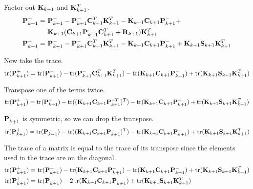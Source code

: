 Factor out $\mathbf{K}_{k+1}$ and $\mathbf{K}_{k+1}^T$.
\begin{align}
  \mathbf{P}_{k+1}^+ =~&
    \mathbf{P}_{k+1}^- - \mathbf{P}_{k+1}^-\mathbf{C}_{k+1}^T\mathbf{K}_{k+1}^T -
    \mathbf{K}_{k+1}\mathbf{C}_{k+1}\mathbf{P}_{k+1}^- + \nonumber \\
    &\mathbf{K}_{k+1}(\mathbf{C}_{k+1}\mathbf{P}_{k+1}^-\mathbf{C}_{k+1}^T +
    \mathbf{R}_{k+1})\mathbf{K}_{k+1}^T \nonumber \\
  \mathbf{P}_{k+1}^+ =~&
    \mathbf{P}_{k+1}^- - \mathbf{P}_{k+1}^-\mathbf{C}_{k+1}^T\mathbf{K}_{k+1}^T -
    \mathbf{K}_{k+1}\mathbf{C}_{k+1}\mathbf{P}_{k+1}^- +
    \mathbf{K}_{k+1}\mathbf{S}_{k+1}\mathbf{K}_{k+1}^T \label{eq:post_p_update}
\end{align}

Now take the trace.
\begin{equation*}
  \operatorname{tr}(\mathbf{P}_{k+1}^+) =
    \operatorname{tr}(\mathbf{P}_{k+1}^-) - \operatorname{tr}(\mathbf{P}_{k+1}^-\mathbf{C}_{k+1}^T\mathbf{K}_{k+1}^T) -
    \operatorname{tr}(\mathbf{K}_{k+1}\mathbf{C}_{k+1}\mathbf{P}_{k+1}^-) +
    \operatorname{tr}(\mathbf{K}_{k+1}\mathbf{S}_{k+1}\mathbf{K}_{k+1}^T)
\end{equation*}

Transpose one of the terms twice.
\begin{equation*}
  \operatorname{tr}(\mathbf{P}_{k+1}^+) = \operatorname{tr}(\mathbf{P}_{k+1}^-) -
    \operatorname{tr}((\mathbf{K}_{k+1}\mathbf{C}_{k+1}\mathbf{P}_{k+1}^{-T})^T) -
    \operatorname{tr}(\mathbf{K}_{k+1}\mathbf{C}_{k+1}\mathbf{P}_{k+1}^-) +
    \operatorname{tr}(\mathbf{K}_{k+1}\mathbf{S}_{k+1}\mathbf{K}_{k+1}^T)
\end{equation*}

$\mathbf{P}_{k+1}^-$ is symmetric, so we can drop the transpose.
\begin{equation*}
  \operatorname{tr}(\mathbf{P}_{k+1}^+) = \operatorname{tr}(\mathbf{P}_{k+1}^-) -
    \operatorname{tr}((\mathbf{K}_{k+1}\mathbf{C}_{k+1}\mathbf{P}_{k+1}^-)^T) -
    \operatorname{tr}(\mathbf{K}_{k+1}\mathbf{C}_{k+1}\mathbf{P}_{k+1}^-) +
    \operatorname{tr}(\mathbf{K}_{k+1}\mathbf{S}_{k+1}\mathbf{K}_{k+1}^T)
\end{equation*}

The trace of a matrix is equal to the trace of its transpose since the elements
used in the trace are on the diagonal.
\begin{align*}
  \operatorname{tr}(\mathbf{P}_{k+1}^+) &= \operatorname{tr}(\mathbf{P}_{k+1}^-) -
    \operatorname{tr}(\mathbf{K}_{k+1}\mathbf{C}_{k+1}\mathbf{P}_{k+1}^-) -
    \operatorname{tr}(\mathbf{K}_{k+1}\mathbf{C}_{k+1}\mathbf{P}_{k+1}^-) +
    \operatorname{tr}(\mathbf{K}_{k+1}\mathbf{S}_{k+1}\mathbf{K}_{k+1}^T) \\
  \operatorname{tr}(\mathbf{P}_{k+1}^+) &= \operatorname{tr}(\mathbf{P}_{k+1}^-) -
    2\operatorname{tr}(\mathbf{K}_{k+1}\mathbf{C}_{k+1}\mathbf{P}_{k+1}^-) +
    \operatorname{tr}(\mathbf{K}_{k+1}\mathbf{S}_{k+1}\mathbf{K}_{k+1}^T)
\end{align*}

